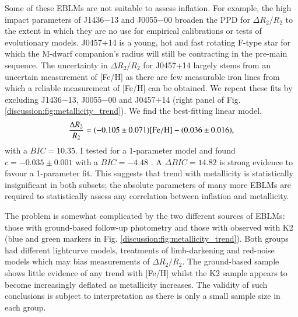 Some of these EBLMs are not suitable to assess inflation. For example, the high impact parameters of J1436$-$13 and J0055$-$00 broaden the PPD for $\Delta R_2 / R_2$ to the extent in which they are no use for empirical calibrations or tests of evolutionary models. J0457$+$14 is a young, hot and fast rotating F-type star for which the M-dwarf companion's radius will still be contracting in the pre-main sequence. The uncertainty in  $\Delta R_2 / R_2$ for J0457$+$14 largely stems from an uncertain measurement of [Fe/H] as there are few measurable iron lines from which a reliable measurement of [Fe/H] can be obtained. We repeat these fits by excluding J1436$-$13, J0055$-$00 and J0457$+$14 (right panel of Fig. \ref{discussion:fig:metallicity_trend}). We find the best-fitting linear model,
%
\begin{equation}
    \frac{\Delta R_2}{R_2} = (-0.105 \pm 0.071) \rm [Fe/H] - (0.036 \pm 0.016),
\end{equation}
%
with a $BIC=10.35$. I tested for a 1-parameter model and found $c = -0.035 \pm 0.001$ with a $BIC = -4.48$ . A $\Delta BIC = 14.82$ is strong evidence to favour a 1-parameter fit. This suggests that trend with metallicity is statistically insignificant in both subsets; the absolute parameters of many more EBLMs are required to statistically assess any correlation between inflation and metallicity. 

The problem is somewhat complicated by the two different sources of EBLMs: those with ground-based follow-up photometry and those with observed with K2 (blue and green markers in Fig. \ref{discussion:fig:metallicity_trend}). Both groups had different lightcurve models, treatments of limb-darkening and red-noise models which may bias measurements of $\Delta R_2 / R_2$. The ground-based sample shows little evidence of any trend with [Fe/H] whilst the K2 sample appears to become increasingly deflated as metallicity increases. The validity of such conclusions is subject to interpretation as there is only a small sample size in each group.

